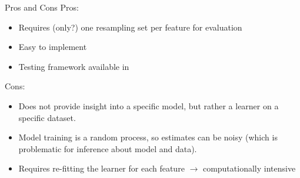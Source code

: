 \documentclass[11pt,compress,t,notes=noshow, aspectratio=169, xcolor=table]{beamer}
\begin{document}
\begin{vbframe}{Pros and Cons}
  Pros:
  \begin{itemize}
    \item Requires (only?) one resampling set per feature for evaluation
    \item Easy to implement
    \item Testing framework available in \cite{lei_distribution-free_2018}
  \end{itemize}
%
  Cons:
  \begin{itemize}
    \item Does not provide insight into a specific model, but rather a learner on a specific dataset.
    \item Model training is a random process, so estimates can be noisy (which is problematic for inference about model and data).
    \item Requires re-fitting the learner for each feature $\rightarrow$ computationally intensive
  \end{itemize}
\end{vbframe}


\endlecture
\end{document}
